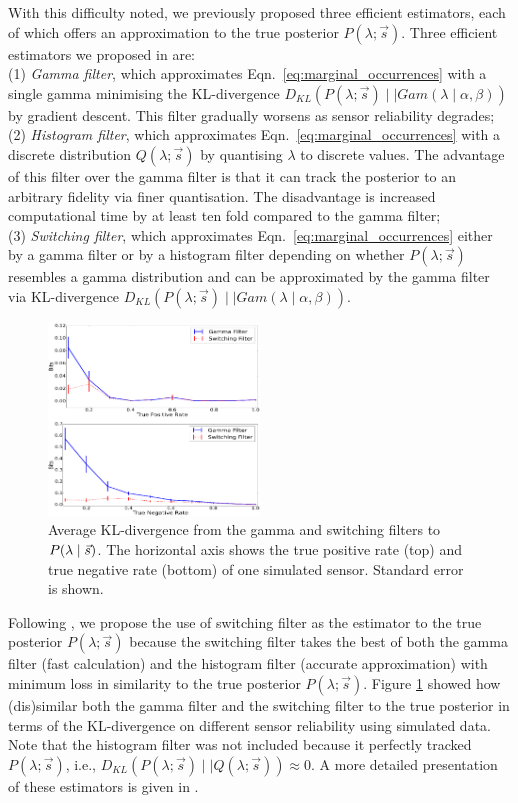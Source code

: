With this difficulty noted, we previously proposed three efficient estimators, each of which offers an approximation to the true posterior $P(\lambda ; \vec{s})$. Three efficient estimators we proposed in \cite{jovan18a} are: \\
(1) \textit{Gamma filter}, which approximates Eqn.~\ref{eq:marginal_occurrences} with a single gamma minimising the KL-divergence $D_{KL}(P(\lambda ; \vec{s}) \mid \mid Gam(\lambda \mid \alpha, \beta))$ by gradient descent. This filter gradually worsens as sensor reliability degrades; \\
(2) \textit{Histogram filter}, which approximates Eqn.~\ref{eq:marginal_occurrences} with a discrete distribution $Q(\lambda ; \vec{s})$ by quantising $\lambda$ to discrete values. The advantage of this filter over the gamma filter is that it can track the posterior to an arbitrary fidelity via finer quantisation. The disadvantage is increased computational time by at least ten fold compared to the gamma filter; \\
(3) \textit{Switching filter}, which approximates Eqn.~\ref{eq:marginal_occurrences} either by a gamma filter or by a histogram filter depending on whether $P(\lambda ; \vec{s})$  resembles a gamma distribution and can be approximated by the gamma filter via KL-divergence $D_{KL}(P(\lambda ; \vec{s}) \mid \mid Gam(\lambda \mid \alpha, \beta))$.

\begin{figure}[t!]
	\centering
	\includegraphics[width=0.5\textwidth]{./figures/kl_div_tpr_tnr_var.png}
	\caption{Average KL-divergence from the gamma and switching filters to $P(\lambda \mid \protect\vec{s})$. The horizontal axis shows the true positive rate (top) and true negative rate (bottom) of one simulated sensor. Standard error is shown. \cite{jovan18a}} 
	\label{fig:kl_div_tpr_tnr_var}
\end{figure}

Following \cite{jovan18a}, we propose the use of switching filter as the estimator to the true posterior $P(\lambda ; \vec{s})$ because the switching filter takes the best of both the gamma filter (fast calculation) and the histogram filter (accurate approximation) with minimum loss in similarity to the true posterior $P(\lambda ; \vec{s})$. Figure \ref{fig:kl_div_tpr_tnr_var} showed how (dis)similar both the gamma filter and the switching filter to the true posterior in terms of the KL-divergence on different sensor reliability using simulated data. Note that the histogram filter was not included because it perfectly tracked $P(\lambda ; \vec{s})$, i.e., $D_{KL}(P(\lambda ; \vec{s}) \mid \mid Q(\lambda ; \vec{s})) \approx 0$. A more detailed presentation of these estimators is given in \cite{jovan18a}.